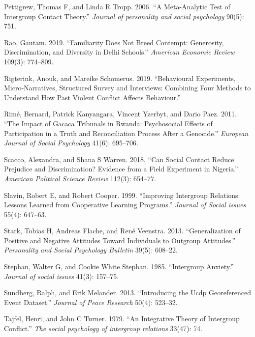 \documentclass[11pt]{article}
\begin{document}
\begin{cslreferences}
\leavevmode\hypertarget{ref-pettigrew2006meta}{}%
Pettigrew, Thomas F, and Linda R Tropp. 2006. ``A Meta-Analytic Test of
Intergroup Contact Theory.'' \emph{Journal of personality and social
psychology} 90(5): 751.

\leavevmode\hypertarget{ref-rao2019familiarity}{}%
Rao, Gautam. 2019. ``Familiarity Does Not Breed Contempt: Generosity,
Discrimination, and Diversity in Delhi Schools.'' \emph{American
Economic Review} 109(3): 774--809.

\leavevmode\hypertarget{ref-rigterink2019isa}{}%
Rigterink, Anouk, and Mareike Schomerus. 2019. ``Behavioural
Experiments, Micro-Narratives, Structured Survey and Interviews:
Combining Four Methods to Understand How Past Violent Conflict Affects
Behaviour.''

\leavevmode\hypertarget{ref-rime2011impact}{}%
Rimé, Bernard, Patrick Kanyangara, Vincent Yzerbyt, and Dario Paez.
2011. ``The Impact of Gacaca Tribunals in Rwanda: Psychosocial Effects
of Participation in a Truth and Reconciliation Process After a
Genocide.'' \emph{European Journal of Social Psychology} 41(6):
695--706.

\leavevmode\hypertarget{ref-scacco2018nigeria}{}%
Scacco, Alexandra, and Shana S Warren. 2018. ``Can Social Contact Reduce
Prejudice and Discrimination? Evidence from a Field Experiment in
Nigeria.'' \emph{American Political Science Review} 112(3): 654--77.

\leavevmode\hypertarget{ref-slavin1999improving}{}%
Slavin, Robert E, and Robert Cooper. 1999. ``Improving Intergroup
Relations: Lessons Learned from Cooperative Learning Programs.''
\emph{Journal of Social issues} 55(4): 647--63.

\leavevmode\hypertarget{ref-stark2013generalization}{}%
Stark, Tobias H, Andreas Flache, and René Veenstra. 2013.
``Generalization of Positive and Negative Attitudes Toward Individuals
to Outgroup Attitudes.'' \emph{Personality and Social Psychology
Bulletin} 39(5): 608--22.

\leavevmode\hypertarget{ref-stephan1985intergroup}{}%
Stephan, Walter G, and Cookie White Stephan. 1985. ``Intergroup
Anxiety.'' \emph{Journal of social issues} 41(3): 157--75.

\leavevmode\hypertarget{ref-ucdp}{}%
Sundberg, Ralph, and Erik Melander. 2013. ``Introducing the Ucdp
Georeferenced Event Dataset.'' \emph{Journal of Peace Research} 50(4):
523--32.

\leavevmode\hypertarget{ref-tajfel1979integrative}{}%
Tajfel, Henri, and John C Turner. 1979. ``An Integrative Theory of
Intergroup Conflict.'' \emph{The social psychology of intergroup
relations} 33(47): 74.


\end{cslreferences}
\end{document}
